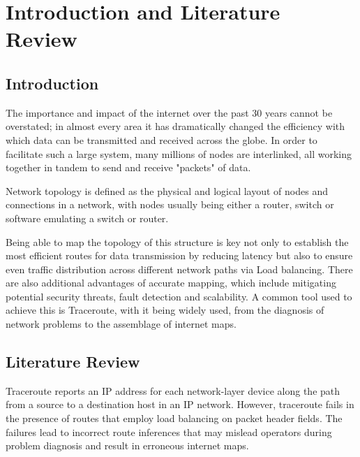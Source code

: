 \section{Introduction and Literature Review}




\subsection{Introduction}
The importance and impact of the internet over the past 30 years cannot be overstated; in almost every area it has dramatically changed the efficiency with which data can be transmitted and received across the globe. In order to facilitate such a large system, many millions of nodes are interlinked, all working together in tandem to send and receive "packets" of data. 

Network topology is defined as the physical and logical layout of nodes and connections in a network, with nodes usually being either a router, switch or software emulating a switch or router. 

Being able to map the topology of this structure is key not only to establish the most efficient routes for data transmission by reducing latency but also to ensure even traffic distribution across different network paths via Load balancing. There are also additional advantages of accurate mapping, which include mitigating potential security threats, fault detection and scalability. A common tool used to achieve this is Traceroute, with it being widely used, from the diagnosis of network
problems to the assemblage of internet maps. \cite{anomalies}


\subsection{Literature Review}

Traceroute reports an IP address for each network-layer device along the path from a source to a destination host in an IP network\cite{jacobson1989traceroute}. However, traceroute fails in the presence of routes that employ load balancing on packet header fields. The failures lead to incorrect route inferences that may mislead operators during problem diagnosis and result in erroneous internet maps.\cite{anomalies}\cite{exhaustive}

